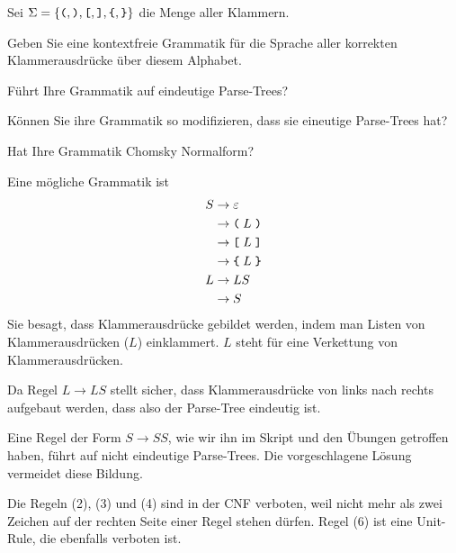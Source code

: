 Sei $\Sigma=\{
\texttt{(},
\texttt{)},
\texttt{[},
\texttt{]},
\verb+{+,
\verb+}+
\}$
die Menge aller Klammern.
\begin{teilaufgaben}
\item
Geben Sie eine kontextfreie Grammatik für die Sprache aller korrekten
Klammerausdrücke über diesem Alphabet.
\item
Führt Ihre Grammatik auf eindeutige Parse-Trees?
\item
Können Sie ihre Grammatik so modifizieren, dass sie eineutige Parse-Trees hat?
\item
Hat Ihre Grammatik Chomsky Normalform?
\end{teilaufgaben}

\begin{loesung}
\begin{teilaufgaben}
\item
Eine mögliche Grammatik ist
\begin{align}
S&\rightarrow \varepsilon 
\\
 &\rightarrow \texttt{(} \; L \; \texttt{)}
\\
 &\rightarrow \texttt{[} \; L \; \texttt{]}
\\
 &\rightarrow \texttt{\char`\{} \; L \; \texttt{\char`\}}
\\
L&\rightarrow LS
\\
 &\rightarrow S
\end{align}
Sie besagt, dass Klammerausdrücke gebildet werden, indem man Listen
von Klammerausdrücken ($L$) einklammert.
$L$ steht für eine Verkettung von Klammerausdrücken.
\item
Da Regel $L\rightarrow LS$ stellt sicher, dass Klammerausdrücke von links
nach rechts aufgebaut werden, dass also der Parse-Tree eindeutig ist.
\item
Eine Regel der Form $S\rightarrow SS$, wie wir ihn im Skript und den
Übungen getroffen haben, führt auf nicht eindeutige Parse-Trees.
Die vorgeschlagene Lösung vermeidet diese Bildung.
\item
Die Regeln 
(2), (3) und (4) sind in der CNF verboten, weil nicht mehr als zwei
Zeichen auf der rechten Seite einer Regel stehen dürfen.
Regel (6) ist eine Unit-Rule, die ebenfalls verboten ist.
\qedhere
\end{teilaufgaben}
\end{loesung}




